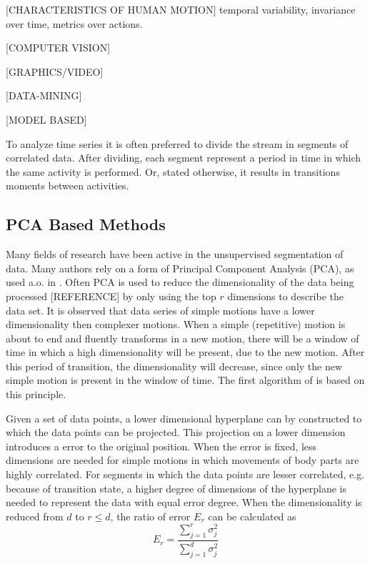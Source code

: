 [CHARACTERISTICS OF HUMAN MOTION]
temporal variability, invariance over time, metrics over actions.

[COMPUTER VISION]

[GRAPHICS/VIDEO]

[DATA-MINING]

[MODEL BASED]

To analyze time series it is often preferred to divide the stream in segments of correlated data.
After dividing, each segment represent a period in time in which the same activity is performed.
Or, stated otherwise, it results in transitions moments between activities.

\subsection{PCA Based Methods}

Many fields of research have been active in the unsupervised segmentation of data.
Many authors rely on a form of Principal Component Analysis (PCA), as used a.o. in \cite{barbivc2004segmenting}.
Often PCA is used to reduce the dimensionality of the data being processed [REFERENCE] by only using the top $r$ dimensions to describe the data set.
It is observed that data series of simple motions have a lower dimensionality then complexer motions.
When a simple (repetitive) motion is about to end and fluently transforms in a new motion, there will be a window of time in which a high dimensionality will be present, due to the new motion.
After this period of transition, the dimensionality will decrease, since only the new simple motion is present in the window of time.
The first algorithm of \cite{barbivc2004segmenting} is based on this principle.

Given a set of data points, a lower dimensional hyperplane can by constructed to which the data points can be projected.
This projection on a lower dimension introduces a error to the original position.
When the error is fixed, less dimensions are needed for simple motions in which movements of body parts are highly correlated.
For segments in which the data points are lesser correlated, e.g. because of transition state, a higher degree of dimensions of the hyperplane is needed to represent the data with equal error degree.
When the dimensionality is reduced from $d$ to $r \le d$, the ratio of error $E_r$ can be calculated as
\begin{equation}
	E_r = \frac{\sum_{j=1}^{r} \sigma_j^2}{\sum_{j=1}^{d} \sigma_j^2}
\end{equation}

